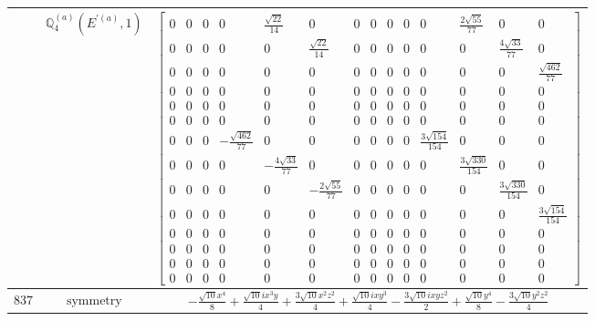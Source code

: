 \documentclass[fleqn,8pt,landscape]{jsarticle}
\begin{document}
\begin{longtable}{ccc}
$  $ & $ \mathbb{Q}_{4}^{(a)}(E^{\prime(a)},1) $ & $ \begin{bmatrix} 0 & 0 & 0 & 0 & \frac{\sqrt{22}}{14} & 0 & 0 & 0 & 0 & 0 & 0 & \frac{2 \sqrt{55}}{77} & 0 & 0 \\ 0 & 0 & 0 & 0 & 0 & \frac{\sqrt{22}}{14} & 0 & 0 & 0 & 0 & 0 & 0 & \frac{4 \sqrt{33}}{77} & 0 \\ 0 & 0 & 0 & 0 & 0 & 0 & 0 & 0 & 0 & 0 & 0 & 0 & 0 & \frac{\sqrt{462}}{77} \\ 0 & 0 & 0 & 0 & 0 & 0 & 0 & 0 & 0 & 0 & 0 & 0 & 0 & 0 \\ 0 & 0 & 0 & 0 & 0 & 0 & 0 & 0 & 0 & 0 & 0 & 0 & 0 & 0 \\ 0 & 0 & 0 & 0 & 0 & 0 & 0 & 0 & 0 & 0 & 0 & 0 & 0 & 0 \\ 0 & 0 & 0 & - \frac{\sqrt{462}}{77} & 0 & 0 & 0 & 0 & 0 & 0 & \frac{3 \sqrt{154}}{154} & 0 & 0 & 0 \\ 0 & 0 & 0 & 0 & - \frac{4 \sqrt{33}}{77} & 0 & 0 & 0 & 0 & 0 & 0 & \frac{3 \sqrt{330}}{154} & 0 & 0 \\ 0 & 0 & 0 & 0 & 0 & - \frac{2 \sqrt{55}}{77} & 0 & 0 & 0 & 0 & 0 & 0 & \frac{3 \sqrt{330}}{154} & 0 \\ 0 & 0 & 0 & 0 & 0 & 0 & 0 & 0 & 0 & 0 & 0 & 0 & 0 & \frac{3 \sqrt{154}}{154} \\ 0 & 0 & 0 & 0 & 0 & 0 & 0 & 0 & 0 & 0 & 0 & 0 & 0 & 0 \\ 0 & 0 & 0 & 0 & 0 & 0 & 0 & 0 & 0 & 0 & 0 & 0 & 0 & 0 \\ 0 & 0 & 0 & 0 & 0 & 0 & 0 & 0 & 0 & 0 & 0 & 0 & 0 & 0 \\ 0 & 0 & 0 & 0 & 0 & 0 & 0 & 0 & 0 & 0 & 0 & 0 & 0 & 0 \end{bmatrix} $ \\ \hline
$ 837 $ & $ \text{symmetry} $ & $ - \frac{\sqrt{10} x^{4}}{8} + \frac{\sqrt{10} i x^{3} y}{4} + \frac{3 \sqrt{10} x^{2} z^{2}}{4} + \frac{\sqrt{10} i x y^{3}}{4} - \frac{3 \sqrt{10} i x y z^{2}}{2} + \frac{\sqrt{10} y^{4}}{8} - \frac{3 \sqrt{10} y^{2} z^{2}}{4} $ \\

\end{longtable}
\end{document}
